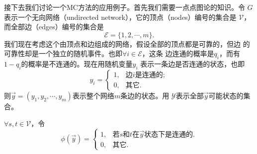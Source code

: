 接下去我们讨论一个MC方法的应用例子。首先我们需要一点点图论的知识。令
$G$表示一个无向网络（undirected network），它的顶点（nodes）编号的集合是
$\mathscr{V}$，而全部边（edges）编号的集合是
$$
\mathscr{E} = \{1, 2, \cdots, m\}.
$$
我们现在考虑这个由顶点和边组成的网络，假设全部的顶点都是可靠的，但边
的可靠性却是一个独立的随机事件。也即$\forall i \in \mathscr{E}$，这条
边连通的概率是$q_i$，而有$1 - q_i$的概率是不连通的。现在用随机变量$y_i$
表示一条边是否连通的状态，也即
$$
y_i = \left\{
\begin{array}{ll}
  1, & \mbox{边$i$是连通的};\\
  0, & \mbox{其它}.
\end{array}
\right.
$$
则$\vec{y} = (y_1, y_2, \cdots, y_m)$表示整个网络$m$条边的状态。用
$\mathscr{Y}$表示全部$\vec{y}$可能状态的集合。

$\forall s, t \in \mathscr{V}$，令
$$
\phi(\vec{y}) = \left\{
\begin{array}{ll}
  1, & \mbox{若$s$和$t$在$\vec{y}$状态下是连通的}.\\
  0, & \mbox{其它}.
\end{array}
\right.
$$

